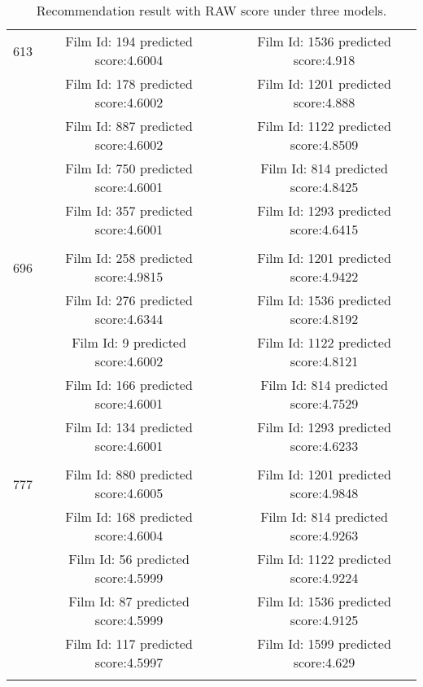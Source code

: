 \begin{longtable}{|c|c|c|c|}
           &            &            &            \\
\hline
\multicolumn{ 1}{|c|}{613} & Film Id: 194 predicted score:4.6004 &            & Film Id: 1536 predicted score:4.918 \\
\hline
\multicolumn{ 1}{|c|}{} & Film Id: 178 predicted score:4.6002 &            & Film Id: 1201 predicted score:4.888 \\
\hline
\multicolumn{ 1}{|c|}{} & Film Id: 887 predicted score:4.6002 &            & Film Id: 1122 predicted score:4.8509 \\
\hline
\multicolumn{ 1}{|c|}{} & Film Id: 750 predicted score:4.6001 &            & Film Id: 814 predicted score:4.8425 \\
\hline
\multicolumn{ 1}{|c|}{} & Film Id: 357 predicted score:4.6001 &            & Film Id: 1293 predicted score:4.6415 \\
\hline
           &            &            &            \\
\hline
\multicolumn{ 1}{|c|}{696} & Film Id: 258 predicted score:4.9815 &            & Film Id: 1201 predicted score:4.9422 \\
\hline
\multicolumn{ 1}{|c|}{} & Film Id: 276 predicted score:4.6344 &            & Film Id: 1536 predicted score:4.8192 \\
\hline
\multicolumn{ 1}{|c|}{} & Film Id: 9 predicted score:4.6002 &            & Film Id: 1122 predicted score:4.8121 \\
\hline
\multicolumn{ 1}{|c|}{} & Film Id: 166 predicted score:4.6001 &            & Film Id: 814 predicted score:4.7529 \\
\hline
\multicolumn{ 1}{|c|}{} & Film Id: 134 predicted score:4.6001 &            & Film Id: 1293 predicted score:4.6233 \\
\hline
           &            &            &            \\
\hline
\multicolumn{ 1}{|c|}{777} & Film Id: 880 predicted score:4.6005 &            & Film Id: 1201 predicted score:4.9848 \\
\hline
\multicolumn{ 1}{|c|}{} & Film Id: 168 predicted score:4.6004 &            & Film Id: 814 predicted score:4.9263 \\
\hline
\multicolumn{ 1}{|c|}{} & Film Id: 56 predicted score:4.5999 &            & Film Id: 1122 predicted score:4.9224 \\
\hline
\multicolumn{ 1}{|c|}{} & Film Id: 87 predicted score:4.5999 &            & Film Id: 1536 predicted score:4.9125 \\
\hline
\multicolumn{ 1}{|c|}{} & Film Id: 117 predicted score:4.5997 &            & Film Id: 1599 predicted score:4.629 \\
\hline
\caption{Recommendation result with RAW score under three models.}
\end{longtable}  
